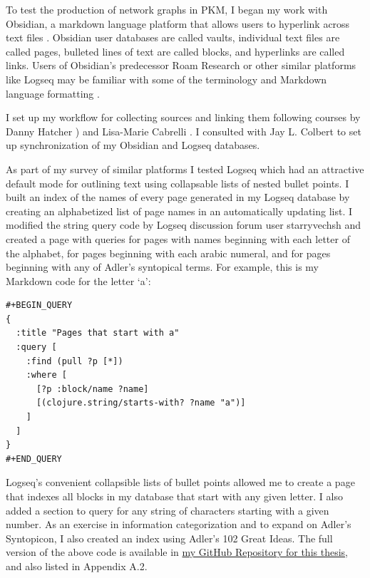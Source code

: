 To test the production of network graphs in PKM, I began my work with Obsidian, a markdown language platform that allows users to hyperlink across text files \citep{obsidian_obsidian_nodate}. Obsidian user databases are called vaults, individual text files are called pages, bulleted lines of text are called blocks, and hyperlinks are called links. Users of Obsidian’s predecessor Roam Research \citep{roam_research_roam_nodate} or other similar platforms like Logseq \citep{logseq_logseq-_nodate} may be familiar with some of the terminology and Markdown language formatting \citep{gruber_markdown_2004} \citep{swartz_html2text_2011}. 

I set up my workflow for collecting sources and linking them following courses by Danny Hatcher \citep{hatcher_become_nodate}) and Lisa-Marie Cabrelli \citep{cabrelli_roam_nodate}. I consulted with Jay L. Colbert \citep{colbert_about_2022} to set up synchronization of my Obsidian and Logseq databases. 

As part of my survey of similar platforms I tested Logseq which had an attractive default mode for outlining text using collapsable lists of nested bullet points. I built an index of the names of every page generated in my Logseq database by creating an alphabetized list of page names in an automatically updating list. I modified the string query code by Logseq discussion forum user starryvechsh \citep{noauthor_how_2022} and created a page with queries for pages with names beginning with each letter of the alphabet, for pages beginning with each arabic numeral, and for pages beginning with any of Adler's syntopical terms. For example, this is my Markdown code for the letter `a':
\begin{verbatim}
#+BEGIN_QUERY
{
  :title "Pages that start with a"
  :query [
    :find (pull ?p [*])
    :where [
      [?p :block/name ?name]
      [(clojure.string/starts-with? ?name "a")]
    ]
  ]
}
#+END_QUERY
\end{verbatim}


Logseq’s convenient collapsible lists of bullet points allowed me to create a page that indexes all blocks in my database that start with any given letter. I also added a section to query for any string of characters starting with a given number. As an exercise in information categorization and to expand on Adler’s Syntopicon\citep{adler_great_1952-2}, I also created an index using Adler’s 102 Great Ideas. The full version of the above code is available in \href{https://github.com/orusmateo/Orus-MCS-Thesis}{my GitHub Repository for this thesis}, and also listed in Appendix A.2. 

